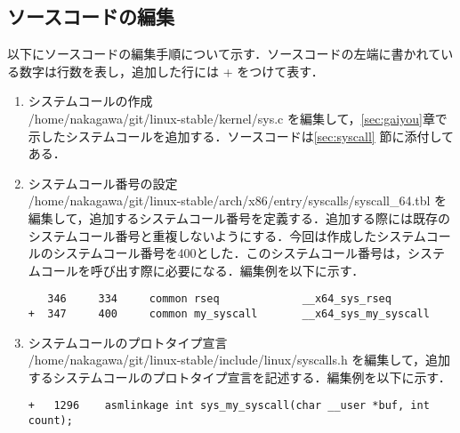 \documentclass[12pt]{jsarticle}
\begin{document}
\subsection{ソースコードの編集}\label{sec:hensyuu}
以下にソースコードの編集手順について示す．ソースコードの左端に書かれている数字は行数を表し，追加した行には + をつけて表す．
  \begin{enumerate}
  \item システムコールの作成\\    
    /home/nakagawa/git/linux-stable/kernel/sys.c を編集して，\ref{sec:gaiyou}章で示したシステムコールを追加する．ソースコードは\ref{sec:syscall} 節に添付してある．
  \item システムコール番号の設定\\
    /home/nakagawa/git/linux-stable/arch/x86/entry/syscalls/syscall\_64.tbl を編集して，追加するシステムコール番号を定義する．追加する際には既存のシステムコール番号と重複しないようにする．今回は作成したシステムコールのシステムコール番号を400とした．このシステムコール番号は，システムコールを呼び出す際に必要になる．編集例を以下に示す．
    
\begin{verbatim}
   346     334     common rseq             __x64_sys_rseq
+  347     400     common my_syscall       __x64_sys_my_syscall
\end{verbatim}

\item システムコールのプロトタイプ宣言\\  
  /home/nakagawa/git/linux-stable/include/linux/syscalls.h を編集して，追加するシステムコールのプロトタイプ宣言を記述する．編集例を以下に示す．
\begin{verbatim}
+   1296    asmlinkage int sys_my_syscall(char __user *buf, int count);
\end{verbatim}
  \end{enumerate}
  
\end{document}
